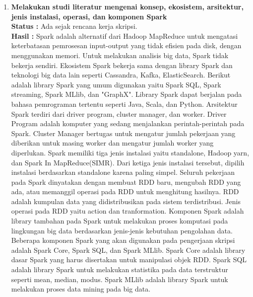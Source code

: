 \documentclass[a4paper,twoside]{article}
\begin{document}
\begin{enumerate}
		\item \textbf{Melakukan studi literatur mengenai konsep, ekosistem,  arsitektur, jenis instalasi, operasi, dan komponen Spark}\\
		{\bf Status :} Ada sejak rencana kerja skripsi.\\
		{\bf Hasil :} Spark adalah alternatif dari Hadoop MapReduce untuk mengatasi keterbatasan pemrosesan input-output yang tidak efisien pada disk, dengan menggunakan memori. Untuk melakukan analisis big data, Spark tidak bekerja sendiri. Ekosistem Spark bekerja sama dengan library Spark dan teknologi big data lain seperti Cassandra, Kafka, ElasticSearch. Berikut adalah library Spark yang umum digunakan yaitu Spark SQL, Spark streaming, Spark MLlib, dan "GraphX". Library Spark dapat berjalan pada bahasa pemrograman tertentu seperti Java, Scala, dan Python. Arsitektur Spark terdiri dari driver program, cluster manager, dan worker. Driver Program adalah komputer yang sedang menjalankan perintah-perintah pada Spark. Cluster Manager  bertugas untuk mengatur jumlah pekerjaan yang diberikan untuk masing worker dan mengatur jumlah worker yang diperlukan. Spark memiliki tiga jenis instalasi yaitu standalone, Hadoop yarn, dan Spark In MapReduce(SIMR). Dari ketiga jenis instalasi tersebut, dipilih instalasi berdasarkan standalone karena paling simpel. Seluruh pekerjaan pada Spark dinyatakan dengan membuat RDD baru, mengubah RDD yang ada, atau memanggil operasi pada RDD untuk menghitung hasilnya. RDD adalah kumpulan data yang didistribusikan pada sistem terdistribusi. Jenis operasi pada RDD yaitu action dan tranformation. Komponen Spark adalah library tambahan pada Spark untuk melakukan proses komputasi pada
lingkungan big data berdasarkan jenis-jenis kebutuhan pengolahan data. Beberapa komponen Spark yang akan digunakan pada pengerjaan skripsi adalah Spark Core, Spark SQL, dan Spark MLlib. Spark Core adalah library dasar Spark yang harus disertakan untuk manipulasi objek RDD. Spark SQL adalah library  Spark untuk melakukan statistika pada data terstruktur seperti mean, median, modus. Spark MLlib adalah library Spark untuk melakukan proses data mining pada big data. 


\end{enumerate}
\end{document}
